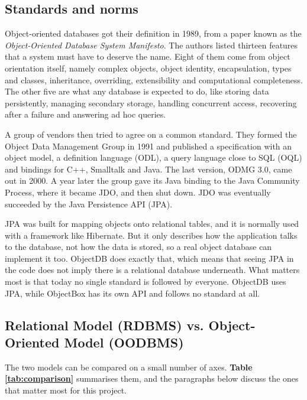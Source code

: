 \documentclass{article}
\begin{document}
\subsection{Standards and norms}

Object-oriented databases got their definition in 1989, from a paper known as the \emph{Object-Oriented Database System Manifesto}\cite{manifesto}.
The authors listed thirteen features that a system must have to deserve the name.
Eight of them come from object orientation itself, namely complex objects, object
identity, encapsulation, types and classes, inheritance, overriding, extensibility
and computational completeness.
The other five are what any database is expected to do, like storing data persistently, managing secondary storage, handling
concurrent access, recovering after a failure and answering ad hoc queries.

A group of vendors then tried to agree on a common standard.
They formed the Object Data Management Group in 1991 and published a specification with an object model,
a definition language (ODL), a query language close to SQL (OQL) and bindings for C++, Smalltalk and Java.
The last version, ODMG 3.0, came out in 2000\cite{odmg}. A year later the group gave its Java binding to the Java
Community Process, where it became JDO, and then shut down. JDO was eventually succeeded by the Java Persistence API (JPA).

JPA was built for mapping objects onto relational tables, and it is normally used with a framework like Hibernate.
But it only describes how the application talks to the database, not how the data is stored, so a real object database can
implement it too.
ObjectDB does exactly that, which means that seeing JPA in the code does not imply there is a relational database underneath.
What matters most is that today no single standard is followed by everyone. ObjectDB uses JPA, while ObjectBox has its own API
and follows no standard at all.

\subsection{Relational Model (RDBMS) vs. Object-Oriented Model (OODBMS)}

The two models can be compared on a small number of axes. \textbf{Table \ref{tab:comparison}} summarises them, and the paragraphs below discuss the ones that matter most for
this project.
\end{document}
